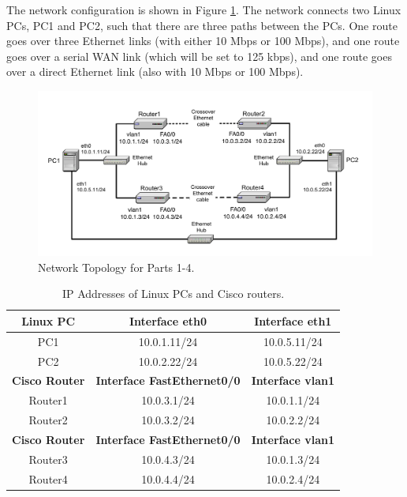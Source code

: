 The network configuration is shown in Figure \ref{fig:lab5-network-topology2}. The network connects two Linux PCs, PC1 and PC2, such that there are three paths between the PCs. One route goes over three Ethernet links (with either 10 Mbps or 100 Mbps), and one route goes over a serial WAN link (which will be set to 125 kbps), and one route goes over a direct Ethernet link (also with 10 Mbps or 100 Mbps).

\begin{figure}[ht]
	\includegraphics[width=\linewidth]{graphics/fig-5-2-updated.pdf}	
	\caption{Network Topology for Parts 1-4.}
	\label{fig:lab5-network-topology2}
\end{figure}


\begin{table}[ht]
	\centering
	\begin{tabular}{ |c c c| }
		\hline
		\textbf{Linux PC} & \textbf{Interface eth0} & \textbf{Interface eth1} \\ \hline
		PC1 & 10.0.1.11/24 & 10.0.5.11/24 \\ 
		PC2 & 10.0.2.22/24 & 10.0.5.22/24 \\ \hline
		\textbf{Cisco Router} & \textbf{Interface FastEthernet0/0} & \textbf{Interface vlan1} \\ \hline
		Router1 & 10.0.3.1/24 & 10.0.1.1/24 \\ 
		Router2 & 10.0.3.2/24 & 10.0.2.2/24 \\ \hline
		\textbf{Cisco Router} & \textbf{Interface FastEthernet0/0} & \textbf{Interface vlan1} \\ \hline
		Router3 & 10.0.4.3/24 & 10.0.1.3/24 \\ 
		Router4 & 10.0.4.4/24 & 10.0.2.4/24 \\ \hline
	\end{tabular}
	\caption{IP Addresses of Linux PCs and Cisco routers.}
	\label{tab:lab5-ip-addresses-2}
\end{table}


